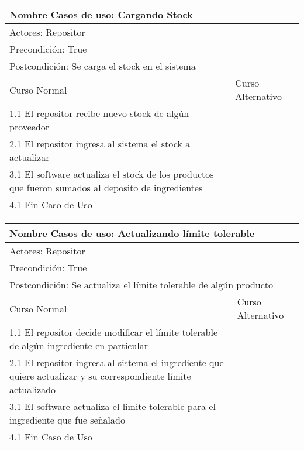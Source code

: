\documentclass[a4paper,10pt]{article}
\begin{document}
\begin{center}
\begin{tabularx}{14cm}{|X|X|}
\hline
\multicolumn{2}{|l|}{Nombre Casos de uso: Cargando Stock}\\
\hline
\multicolumn{2}{|l|}{Actores: Repositor}\\
\hline
\multicolumn{2}{|l|}{Precondici\'on: True}\\
\hline
\multicolumn{2}{|l|}{Postcondici\'on: Se carga el stock en el sistema}\\
\hline
Curso Normal & Curso Alternativo\\
\hline
1.1 El repositor recibe nuevo stock de alg\'un proveedor & 
\\
\hline
2.1 El repositor ingresa al sistema el stock a actualizar & 
\\
\hline
3.1 El software actualiza el stock de los productos que fueron sumados al deposito de ingredientes &
\\
\hline
4.1 Fin Caso de Uso &
\\
\hline
\end{tabularx}
\end{center}


\bigskip

\begin{center}
\begin{tabularx}{14cm}{|X|X|}
\hline
\multicolumn{2}{|l|}{Nombre Casos de uso: Actualizando l\'imite tolerable}\\
\hline
\multicolumn{2}{|l|}{Actores: Repositor}\\
\hline
\multicolumn{2}{|l|}{Precondici\'on: True}\\
\hline
\multicolumn{2}{|l|}{Postcondici\'on: Se actualiza el l\'imite tolerable de alg\'un producto}\\
\hline
Curso Normal & Curso Alternativo\\
\hline
1.1 El repositor decide modificar el l\'imite tolerable de alg\'un ingrediente en particular & 
\\
\hline
2.1 El repositor ingresa al sistema el ingrediente que quiere actualizar y su correspondiente l\'imite actualizado & 
\\
\hline
3.1 El software actualiza el l\'imite tolerable para el ingrediente que fue se\~{n}alado &
\\
\hline
4.1 Fin Caso de Uso &
\\
\hline
\end{tabularx}
\end{center}
\end{document}
